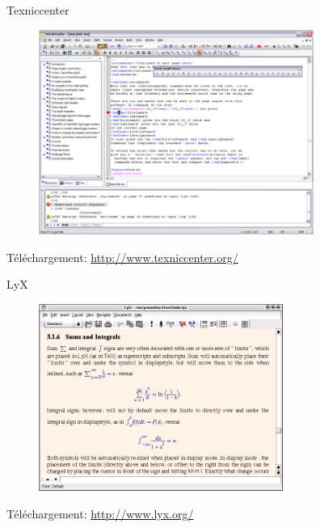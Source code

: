 \documentclass{beamer}
\begin{document}

\begin{frame}{Texniccenter}

\begin{figure}
\centering
\includegraphics[width=9cm]{img/Texniccenter}
\end{figure}

{\footnotesize Téléchargement: \url{http://www.texniccenter.org/}}

\end{frame}



\begin{frame}{LyX}

\begin{figure}
\centering
\includegraphics[width=8cm]{img/LyXScreen_Linux_en}
\end{figure}

{\footnotesize Téléchargement: \url{http://www.lyx.org/}}

\end{frame}


\end{document}

